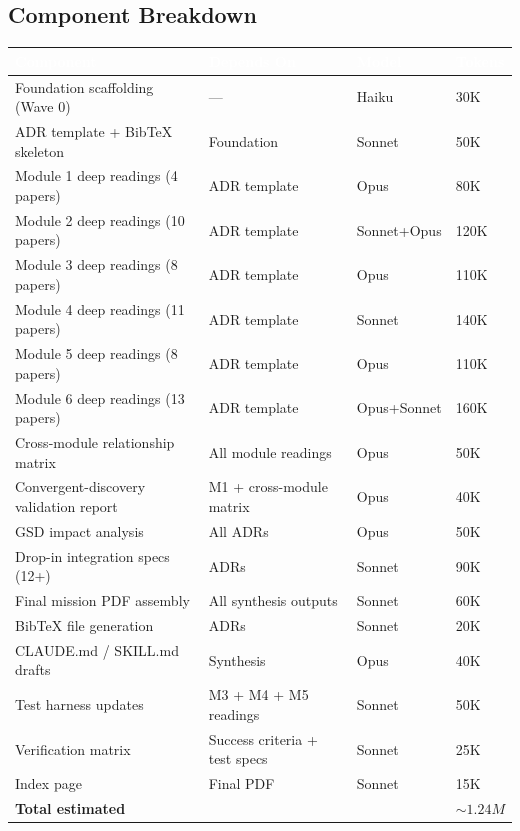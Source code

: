 \documentclass[11pt,letterpaper]{article}
\newcommand{\tableheader}[1]{\textbf{\sffamily\textcolor{white}{#1}}}
\begin{document}
\subsection{Component Breakdown}

\begin{center}
\begin{tabularx}{\textwidth}{L{3.5cm}L{3.5cm}C{1.8cm}C{1.8cm}}
\toprule
{}
\tableheader{Component} & \tableheader{Depends On} & \tableheader{Model} & \tableheader{Tokens} \\
\midrule
Foundation scaffolding (Wave 0) & --- & Haiku & 30K \\
ADR template + BibTeX skeleton & Foundation & Sonnet & 50K \\
Module 1 deep readings (4 papers) & ADR template & Opus & 80K \\
Module 2 deep readings (10 papers) & ADR template & Sonnet+Opus & 120K \\
Module 3 deep readings (8 papers) & ADR template & Opus & 110K \\
Module 4 deep readings (11 papers) & ADR template & Sonnet & 140K \\
Module 5 deep readings (8 papers) & ADR template & Opus & 110K \\
Module 6 deep readings (13 papers) & ADR template & Opus+Sonnet & 160K \\
Cross-module relationship matrix & All module readings & Opus & 50K \\
Convergent-discovery validation report & M1 + cross-module matrix & Opus & 40K \\
GSD impact analysis & All ADRs & Opus & 50K \\
Drop-in integration specs (12+) & ADRs & Sonnet & 90K \\
Final mission PDF assembly & All synthesis outputs & Sonnet & 60K \\
BibTeX file generation & ADRs & Sonnet & 20K \\
CLAUDE.md / SKILL.md drafts & Synthesis & Opus & 40K \\
Test harness updates & M3 + M4 + M5 readings & Sonnet & 50K \\
Verification matrix & Success criteria + test specs & Sonnet & 25K \\
Index page & Final PDF & Sonnet & 15K \\
\midrule
{}
\textbf{Total estimated} & & & \textbf{${\sim}1.24M$} \\
\bottomrule
\end{tabularx}
\end{center}
\end{document}
